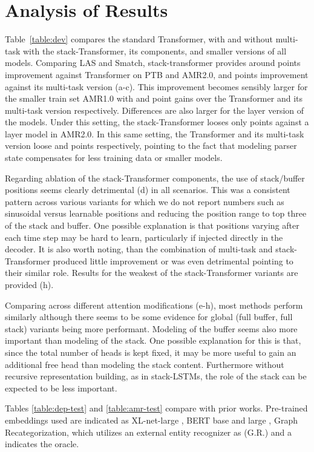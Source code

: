 \documentclass[11pt,a4paper]{article}
\begin{document}
\section{Analysis of Results}
\label{section:results}


Table~\ref{table:dev} compares the standard Transformer, with and without multi-task with the stack-Transformer, its components, and smaller versions of all models. Comparing LAS and Smatch, stack-transformer provides around  points improvement against Transformer on PTB and AMR2.0, and  points improvement against its multi-task version (a-c). This improvement becomes sensibly larger for the smaller train set AMR1.0 with  and  point gains over the Transformer and its multi-task version respectively. Differences are also larger for the  layer version of the models. Under this setting, the stack-Transformer looses only  points against a  layer model in AMR2.0. In this same setting, the Transformer and its multi-task version loose  and  points respectively, pointing to the fact that modeling parser state compensates for less training data or smaller models.

Regarding ablation of the stack-Transformer components, the use of stack/buffer positions seems clearly detrimental (d) in all scenarios. This was a consistent pattern across various variants for which we do not report numbers such as sinusoidal versus learnable positions and reducing the position range to top three of the stack and buffer. One possible explanation is that positions varying after each time step may be hard to learn, particularly if injected directly in the decoder. It is also worth noting, than the combination of multi-task and stack-Transformer produced little improvement or was even detrimental pointing to their similar role. Results for the weakest of the stack-Transformer variants are provided (h).

Comparing across different attention modifications (e-h), most methods perform similarly although there seems to be some evidence for global (full buffer, full stack) variants being more performant. Modeling of the buffer seems also more important than modeling of the stack. One possible explanation for this is that, since the total number of heads is kept fixed, it may be more useful to gain an additional free head than modeling the stack content. Furthermore without recursive representation building, as in stack-LSTMs, the role of the stack can be expected to be less important. 

Tables \ref{table:dep-test} and \ref{table:amr-test} compare with prior works. Pre-trained embeddings used are indicated as XL-net-large \cite{yang2019xlnet}, BERT base and large \cite{devlin-etal-2019-bert}, Graph Recategorization, which utilizes an external entity recognizer \cite{lyu2018amr,zhang2019broad} as (G.R.) and a indicates the  oracle.
\end{document}
